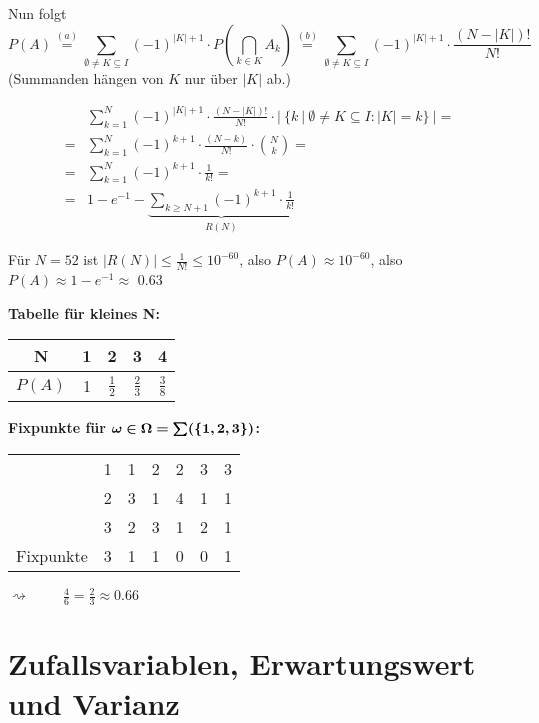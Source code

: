 \documentclass[parskip = full, 12pt]{scrartcl}
\begin{document}
	Nun folgt 
		$$P(A) \mathop{=}\limits^{(a)} \sum_{\emptyset \neq K \subseteq I} (-1)^{|K| 
			+1} \cdot P(\bigcap_{k \in K} A_k) \mathop{=}\limits^{(b)} \sum_{\emptyset 
			\neq K \subseteq I} (-1)^{|K|+1} \cdot \frac{ (N-|K|)! }{N!} $$
	(Summanden hängen von $K$ nur über $|K|$ ab.)

	\begin{align*}
		&\sum_{k=1}^N (-1)^{|K|+1} \cdot \frac{ (N-|K|)! }{N!} \cdot |\ \{ k\ |\ 
			\emptyset \neq K \subseteq I: |K| = k\}\ | = \\ 
		= &\sum_{k = 1}^N (-1)^{k+1} \cdot \frac{(N-k)}{N!} \cdot \binom{N}{k} = \\
		= &\sum_{k=1}^N (-1)^{k+1} \cdot \frac{1}{k!} = \\
		= &1 - e^{-1} - \underbrace{\sum_{k \geq N + 1}	(-1)^{k+1} \cdot \frac{1}
			{k!}}_{R(N)}
	\end{align*}

	Für $N = 52$ ist $|R(N)| \leq \frac{1}{N!} \leq 10^{-60}$, also $P(A) \approx
	10^{-60}$, also $P(A) \approx 1 - e^{-1} \approx$ 0.63 

	\textbf{Tabelle für kleines N: }
	\begin{tabular}{c|c|c|c|c}
		N & 1 & 2 & 3 & 4 
		\tabularnewline \hline
		$P(A)$ &\rule{0pt}{3ex} 1 & $\frac{1}{2}$ & $\frac{2}{3}$ & $\frac{3}{8}$ 
	\end{tabular}

	\textbf{Fixpunkte für $\bm{\omega \in \Omega = \sum(\{ 1,2,3 \})}$:}

	\begin{tabular}{c|c|c|c|c|c|c}
			& 1 & 1 & 2 & 2 & 3 & 3 \\
			& 2 & 3 & 1 & 4 & 1 & 1 \\
			& 3 & 2 & 3 & 1 & 2 & 1 
			\tabularnewline \hline
		Fixpunkte & 3 & 1 & 1 & 0 & 0 & 1
	\end{tabular}
	\hspace{1cm} $\displaystyle \rightsquigarrow \hspace{1cm}\frac{4}{6} = 
		\frac{2}{3} \approx 0.66$

\section{Zufallsvariablen, Erwartungswert und Varianz}
\label{s: 4. zufallsvariablen, Erwartungswert und Varianz}
\end{document}
